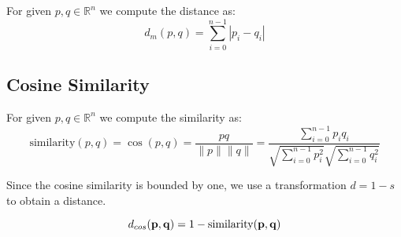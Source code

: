 For given $p, q \in \mathbb{R}^n$ we compute the distance as:
\begin{equation}
d_m({p},{q}) = {\sum_{i=0}^{n-1} |p_i - q_i|}    
\end{equation}


\subsection{Cosine Similarity}

For given $p, q \in \mathbb{R}^n$ we compute the similarity as:
\begin{equation}
\text{similarity}({p},{q}) = \cos ({p},{q})= \frac{pq}{\|{p}\| \|{q}\|} = \frac{ \sum_{i=0}^{n-1}{p_i q_i} }{ \sqrt{\sum_{i=0}^{n-1}{p_i^2}} \sqrt{\sum_{i=0}^{n-1}{q_i^2}} }
\end{equation}

Since the cosine similarity is bounded by one, we use a transformation $d = 1 - s$ to obtain a distance.

\begin{equation}
    d_{cos}({\bf p},{\bf q}) = 1 - \text{similarity}({\bf p},{\bf q})
\end{equation}